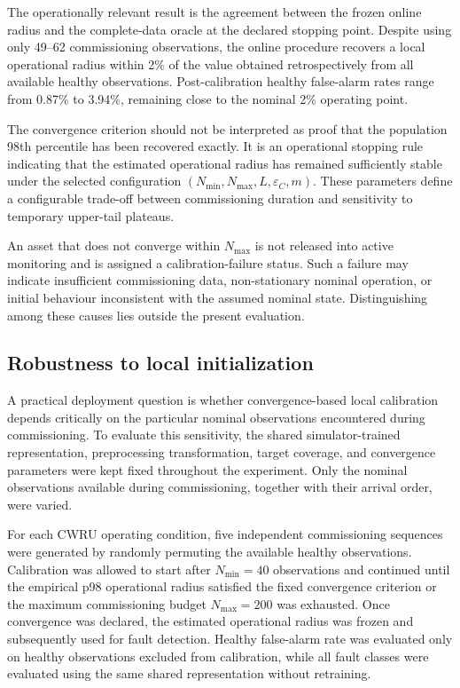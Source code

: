 \documentclass{trbunofficial}
\begin{document}
The operationally relevant result is the agreement between the frozen online
radius and the complete-data oracle at the declared stopping point. Despite
using only 49--62 commissioning observations, the online procedure recovers
a local operational radius within 2\% of the value obtained retrospectively
from all available healthy observations. Post-calibration healthy
false-alarm rates range from 0.87\% to 3.94\%, remaining close to the
nominal 2\% operating point.

The convergence criterion should not be interpreted as proof that the
population 98th percentile has been recovered exactly. 
It is an operational stopping rule indicating that the estimated
operational radius has remained sufficiently stable under the selected
configuration
$(N_{\min},N_{\max},L,\varepsilon_C,m)$. These parameters define a
configurable trade-off between commissioning duration and sensitivity to
temporary upper-tail plateaus.

An asset that does not converge within $N_{\max}$ is not released into
active monitoring and is assigned a calibration-failure status. Such a
failure may indicate insufficient commissioning data, non-stationary nominal
operation, or initial behaviour inconsistent with the assumed nominal state.
Distinguishing among these causes lies outside the present evaluation.

\subsection{Robustness to local initialization}
\label{sec:initialization-robustness}

A practical deployment question is whether convergence-based local
calibration depends critically on the particular nominal observations
encountered during commissioning. To evaluate this sensitivity, the shared
simulator-trained representation, preprocessing transformation, target
coverage, and convergence parameters were kept fixed throughout the
experiment. Only the nominal observations available during commissioning,
together with their arrival order, were varied.

For each CWRU operating condition, five independent commissioning sequences
were generated by randomly permuting the available healthy observations.
Calibration was allowed to start after $N_{\min}=40$ observations and
continued until the empirical p98 operational radius satisfied the fixed
convergence criterion or the maximum commissioning budget
$N_{\max}=200$ was exhausted. Once convergence was declared, the estimated
operational radius was frozen and subsequently used for fault detection.
Healthy false-alarm rate was evaluated only on healthy observations excluded
from calibration, while all fault classes were evaluated using the same
shared representation without retraining.
\end{document}
